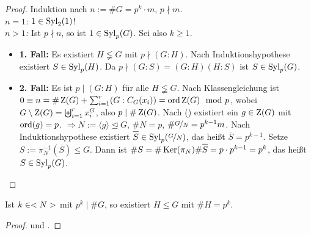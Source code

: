 \begin{proof}
	Induktion nach $n:=\#G=p^k\cdot m$, $p\nmid m$. \\
	\emph{$n=1$:} $1 \in \operatorname{Syl}_2(1)$! \\
	\emph{$n>1$:} Ist $p\nmid n$, so ist $1 \in \operatorname{Syl}_p(G)$. Sei also $k \geq 1$.
	\begin{itemize}
		\item \textbf{1. Fall:} Es existiert $H \lneqq G$ mit $p \nmid (G:H)$. Nach Induktionshypothese existiert $S \in \operatorname{Syl}_p(H)$. Da $p \nmid (G:S)=(G:H)(H:S)$ ist $S \in \operatorname{Syl}_p(G)$.
		\item \textbf{2. Fall:} Es ist $p \mid (G:H)$ für alle $H \lneqq G$. Nach Klassengleichung  ist $0 \equiv n = \#\operatorname{Z}(G) + \sum_{i=1}^{r} (G:C_G(x_i)) = \operatorname{ord}{\operatorname{Z}(G)} \mod p$, wobei $G \setminus \operatorname{Z}(G) = \biguplus_{i=1}^{r}x_i^G$, also $p \mid \#\operatorname{Z}(G)$. Nach  () existiert ein $g \in \operatorname{Z}(G)$ mit $\operatorname{ord}(g) = p$. $\Rightarrow N:=\langle g \rangle \unlhd G$, $\#N = p$, $\# \lnkset{G}{N} = p^{k-1}m$. Nach Induktionshypothese existiert $\overline{S}\in \Syl_p(\lnkset{G}{N})$, das heißt $\overline{S} = p^{k-1}$. Setze $S:= \pi_N^{-1}(\overline{S}) \leq G$. Dann ist $\#S = \#\Ker(\pi_N)\#\overline{S}=p\cdot p^{k-1} = p^k$, das heißt $S \in \operatorname{Syl}_p(G)$.
	\end{itemize}
\end{proof}

\begin{conclusion}
	Ist $k \in <N>$ mit $p^k \mid \#G$, so existiert $H \leq G$ mit $\#H = p^k$.
\end{conclusion}
\begin{proof}
	 und .
\end{proof}

